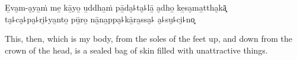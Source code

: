 E̱va̮m-a̮ya̱ṁ me̱ kā̱yo̱ u̱ddha̱ṁ pā̱da̮꜕ta̮꜕lā̱ a̮dho̱ ke̱sa̮ma̱ttha̮kā͓\\
ta̮꜕ca̮꜕pa̮꜕ri̮꜕ya̱nto̱ pū̱ro̱ nā̱na̱ppa̮꜕kā̱ra̱ssa̮꜕ a̮꜕su̮꜕ci̮꜕no͓

\begin{english}
  This, then, which is my body, from the soles of the feet up, and down from the crown of the head, is a sealed bag of skin filled with unattractive things.
\end{english}

